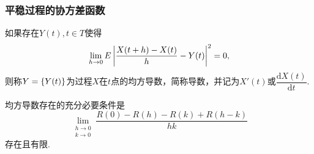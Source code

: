 \begin{frame}
    \frametitle{平稳过程的协方差函数}
    \small
    \begin{mydefinition}[平稳过程的导数]
        如果存在$Y(t),t\in T$使得
        \begin{equation}
            \lim_{h\to0}E\left\lvert\frac{X(t+h)-X(t)}{h}-Y(t)\right\rvert^2=0,
        \end{equation}
        则称$Y=\left\{Y(t)\right\}$为过程$X$在$t$点的均方导数，简称导数，并记为$X'(t)$或$\dfrac{\mathrm dX(t)}{\mathrm dt}$.
    \end{mydefinition} 
    \begin{myproposition}
        均方导数存在的充分必要条件是
        \begin{equation}
            \lim_{\substack{h\to0\\k\to0}}\frac{R(0)-R(h)-R(k)+R(h-k)}{hk}
        \end{equation}
        存在且有限.
    \end{myproposition}
\end{frame}

